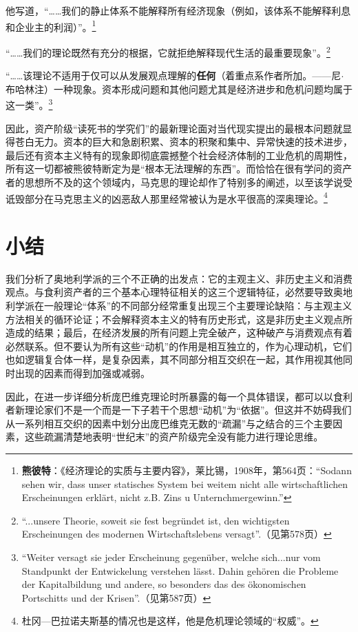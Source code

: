 \documentclass[fontset=fandol, a4paper, 12pt, openright]{ctexbook}
\begin{document}
他写道，“……我们的静止体系不能解释所有经济现象（例如，该体系不能解释利息和企业主的利润）”。\footnote{\textbf{熊彼特}：《经济理论的实质与主要内容》，莱比锡，1908年，第564页：“Sodann sehen wir, dass unser statisches System bei weitem nicht alle wirtschaftlichen Erscheinungen erkl\"{a}rt, nicht z.B. Zins u Unternchmergewinn.”}

“……我们的理论既然有充分的根据，它就拒绝解释现代生活的最重要现象”。\footnote{“...unsere Theorie, soweit sie fest begr\"{u}ndet ist, den wichtigsten Erscheinungen des modernen Wirtschaftslebens versagt”.（见第578页）}

“……该理论不适用于仅可以从发展观点理解的\textbf{任何}（着重点系作者所加。——尼$\cdot$布哈林注）一种现象。资本形成问题和其他问题尤其是经济进步和危机问题均属于这一类”。\footnote{“Weiter versagt sie jeder Erscheinung gegen\"{u}ber, welche sich...nur vom Standpunkt der Entwickelung verstehen l\"{a}sst. Dahin geh\"{o}ren die Probleme der Kapitalbildung und andere, so besonders das des \"{o}konomischen Portschitts und der Krisen”.（见第587页）}

因此，资产阶级“读死书的学究们”的最新理论面对当代现实提出的最根本问题就显得苍白无力。资本的巨大和急剧积累、资本的积聚和集中、异常快速的技术进步，最后还有资本主义特有的现象即彻底震撼整个社会经济体制的工业危机的周期性，所有这一切都被熊彼特断定为是“根本无法理解的东西”。而恰恰在很有学问的资产者的思想所不及的这个领域内，马克思的理论却作了特别多的阐述，以至该学说受诋毁部分在马克思主义的凶恶敌人那里经常被认为是水平很高的深奥理论。\footnote{杜冈—巴拉诺夫斯基的情况也是这样，他是危机理论领域的“权威”。}

\section{小结}

我们分析了奥地利学派的三个不正确的出发点：它的主观主义、非历史主义和消费观点。与食利资产者的三个基本心理特征相关的这三个逻辑特征，必然要导致奥地利学派在一般理论“体系”的不同部分经常重复出现三个主要理论缺陷：与主观主义方法相关的循环论证；不会解释资本主义的特有历史形式，这是非历史主义观点所造成的结果；最后，在经济发展的所有问题上完全破产，这种破产与消费观点有着必然联系。但不要认为所有这些“动机”的作用是相互独立的，作为心理动机，它们也如逻辑复合体一样，是复杂因素，其不同部分相互交织在一起，其作用视其他同时出现的因素而得到加强或减弱。

因此，在进一步详细分析庞巴维克理论时所暴露的每一个具体错误，都可以以食利者新理论家们不是一个而是一下子若干个思想“动机”为“依据”。但这并不妨碍我们从一系列相互交织的因素中划分出庞巴维克无数的“疏漏”与之结合的三个主要因素，这些疏漏清楚地表明“世纪末”的资产阶级完全没有能力进行理论思维。
\end{document}

